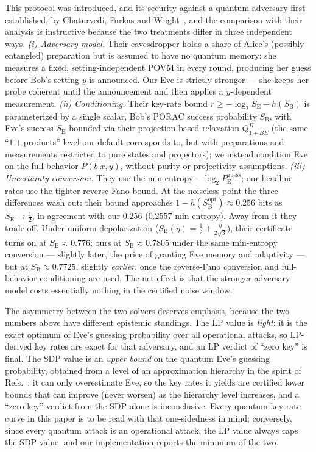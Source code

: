 \documentclass[aps,pra,twocolumn,superscriptaddress,longbibliography,nofootinbib]{revtex4-2}
\newcommand{\Eve}{\mathrm{E}}
\newcommand{\Bob}{\mathrm{B}}
\newcommand{\pguess}{P_{\Eve}^{\mathrm{guess}}}
\begin{document}
This protocol was introduced, and its security against a quantum
adversary first established, by Chaturvedi, Farkas and
Wright~\cite{ChaturvediFarkasWright2021}, and the comparison with their
analysis is instructive because the two treatments differ in three
independent ways. \emph{(i) Adversary model.} Their eavesdropper holds
a share of Alice's (possibly entangled) preparation but is assumed to
have no quantum memory: she measures a fixed, setting-independent POVM
in every round, producing her guess before Bob's setting $y$ is
announced. Our Eve is strictly stronger --- she keeps her probe
coherent until the announcement and then applies a $y$-dependent
measurement. \emph{(ii) Conditioning.} Their key-rate bound
$r \ge -\log_2 S_{\Eve} - h(S_{\Bob})$ is parameterized by a single
scalar, Bob's PORAC success probability $S_{\Bob}$, with Eve's success
$S_{\Eve}$ bounded via their projection-based relaxation
$Q^{\Pi}_{1+BE}$ (the same ``$1{+}$products'' level our default
corresponds to, but with preparations and measurements restricted to
pure states and projectors); we instead condition Eve on the full
behavior $P(b|x,y)$, without purity or projectivity assumptions.
\emph{(iii) Uncertainty conversion.} They use the min-entropy
$-\log_2\pguess$; our headline rates use the tighter reverse-Fano
bound. At the noiseless point the three differences wash out: their
bound approaches $1-h(S_{\Bob}^{\mathrm{opt}})\approx0.256$ bits as
$S_{\Eve}\to\tfrac12$, in agreement with our $0.256$ ($0.2557$
min-entropy). Away from it they trade off. Under uniform
depolarization ($S_{\Bob}(\eta)=\tfrac12+\tfrac{\eta}{2\sqrt3}$), their
certificate turns on at $S_{\Bob}\approx0.776$; ours at
$S_{\Bob}\approx0.7805$ under the same min-entropy conversion ---
slightly later, the price of granting Eve memory and adaptivity ---
but at $S_{\Bob}\approx0.7725$, slightly \emph{earlier}, once the
reverse-Fano conversion and full-behavior conditioning are used. The
net effect is that the stronger adversary model costs essentially
nothing in the certified noise window.

The asymmetry between the two solvers deserves emphasis, because the
two numbers above have different epistemic standings. The LP value is
\emph{tight}: it is the exact optimum of Eve's guessing probability
over all operational attacks, so LP-derived key rates are exact for
that adversary, and an LP verdict of ``zero key'' is final. The SDP
value is an \emph{upper bound} on the quantum Eve's guessing
probability, obtained from a level of an approximation hierarchy in the
spirit of Refs.~\cite{NPA2008,ChaturvediFarkasWright2021}: it can only
overestimate Eve, so the key rates it yields are certified lower bounds
that can improve (never worsen) as the hierarchy level increases, and a
``zero key'' verdict from the SDP alone is inconclusive. Every quantum
key-rate curve in this paper is to be read with that one-sidedness in
mind; conversely, since every quantum attack is an operational attack,
the LP value always caps the SDP value, and our implementation reports
the minimum of the two.
\end{document}
